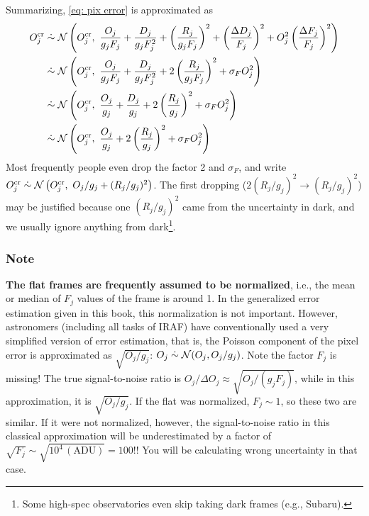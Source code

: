 Summarizing, \cref{eq: pix error} is approximated as
\begin{equation} 
\begin{aligned}
  O_j^\mathrm{cr} 
    &\mathrel{\dot{\sim}} \mathcal{N} 
      \left ( O_j^\mathrm{cr},~ 
        \frac{O_j}{g_jF_j} 
        + \frac{D_j}{g_j F_j^2} 
        + \left (\frac{R_j}{g_j F_j} \right )^2 
        + \left  (\frac{\Delta D_j}{F_j} \right )^2 
        + O_j^2 \left (\frac{\Delta F_j}{F_j} \right )^2
        \right ) \\
    &\mathrel{\dot{\sim}} \mathcal{N} 
      \left ( O_j^\mathrm{cr},~ 
        \frac{O_j}{g_jF_j} 
        + \frac{D_j}{g_j F_j^2} 
        + 2 \left (\frac{R_j}{g_j F_j} \right )^2
        + \sigma_F O_j^2 
        \right ) \\
    &\mathrel{\dot{\sim}} \mathcal{N} 
      \left ( O_j^\mathrm{cr},~ 
        \frac{O_j}{g_j} 
        + \frac{D_j}{g_j} 
        + 2 \left (\frac{R_j}{g_j} \right )^2
        + \sigma_F O_j^2
        \right ) \\
    &\mathrel{\dot{\sim}} \mathcal{N} 
      \left ( O_j^\mathrm{cr},~ 
        \frac{O_j}{g_j} 
        + 2 \left (\frac{R_j}{g_j} \right )^2
        + \sigma_F O_j^2
        \right ) \\
\end{aligned}
\end{equation}
Most frequently people even drop the factor 2 and $ \sigma_F $, and write $ O_j^\mathrm{cr} \mathrel{\dot{\sim}} \mathcal{N} \left ( O_j^\mathrm{cr},~ O_j/g_j + (R_j/g_j)^2 \right ) $. The first dropping ($ 2(R_j/g_j)^2 \rightarrow (R_j/g_j)^2 $) may be justified because one $ (R_j/g_j)^2 $ came from the uncertainty in dark, and we usually ignore anything from dark\footnote{Some high-spec observatories even skip taking dark frames (e.g., Subaru).}. 

\subsubsection{Note}
\textbf{The flat frames are frequently assumed to be normalized}, i.e., the mean or median of $ F_j $ values of the frame is around 1. In the generalized error estimation given in this book, this normalization is not important. However, astronomers (including all tasks of IRAF) have conventionally used a very simplified version of error estimation, that is, the Poisson component of the pixel error is approximated as $ \sqrt{O_j/g_j} $: $ O_j \mathrel{\dot{\sim}} \mathcal{N} (O_j, O_j/g_j) $. Note the factor $ F_j $ is missing! The true signal-to-noise ratio is $ O_j / \Delta O_j \approx \sqrt{O_j / (g_j F_j)} $, while in this approximation, it is $ \sqrt{O_j / g_j} $. If the flat was normalized, $ F_j \sim 1 $, so these two are similar. If it were not normalized, however, the signal-to-noise ratio in this classical approximation will be underestimated by a factor of $ \sqrt{F_j} \sim \sqrt{10^4 \,(\mathrm{ADU})} = 100 $!! You will be calculating wrong uncertainty in that case.


